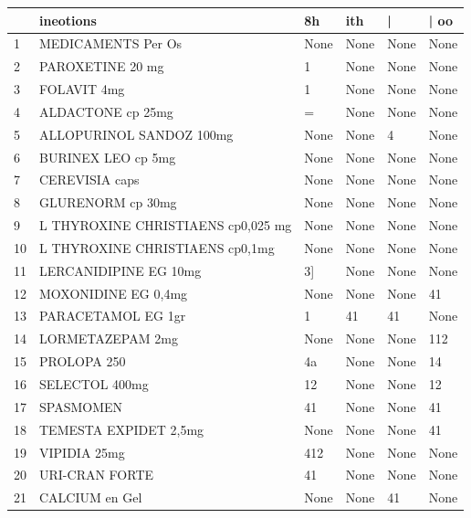\begin{tabular}{llllll}
\toprule
{} &                           ineotions &     8h &   ith &       | &  | oo \\
\midrule
1  &                  MEDICAMENTS Per Os &   None &  None &    None &  None \\
2  &                    PAROXETINE 20 mg &      1 &  None &    None &  None \\
3  &                         FOLAVIT 4mg &      1 &  None &    None &  None \\
4  &                   ALDACTONE cp 25mg &      = &  None &    None &  None \\
5  &            ALLOPURINOL SANDOZ 100mg &   None &  None &       4 &  None \\
6  &                  BURINEX LEO cp 5mg &   None &  None &    None &  None \\
7  &                      CEREVISIA caps &   None &  None &    None &  None \\
8  &                   GLURENORM cp 30mg &   None &  None &    None &  None \\
9  &  L THYROXINE CHRISTIAENS cp0,025 mg &   None &  None &    None &  None \\
10 &     L THYROXINE CHRISTIAENS cp0,1mg &   None &  None &    None &  None \\
11 &               LERCANIDIPINE EG 10mg &     3] &  None &    None &  None \\
12 &                 MOXONIDINE EG 0,4mg &   None &  None &    None &    41 \\
13 &                  PARACETAMOL EG 1gr &      1 &    41 &      41 &  None \\
14 &                    LORMETAZEPAM 2mg &   None &  None &    None &   112 \\
15 &                         PROLOPA 250 &     4a &  None &    None &    14 \\
16 &                      SELECTOL 400mg &     12 &  None &    None &    12 \\
17 &                           SPASMOMEN &     41 &  None &    None &    41 \\
18 &               TEMESTA EXPIDET 2,5mg &   None &  None &    None &    41 \\
19 &                        VIPIDIA 25mg &    412 &  None &    None &  None \\
20 &                      URI-CRAN FORTE &     41 &  None &    None &  None \\
21 &                      CALCIUM en Gel &   None &  None &      41 &  None \\

\end{tabular}

